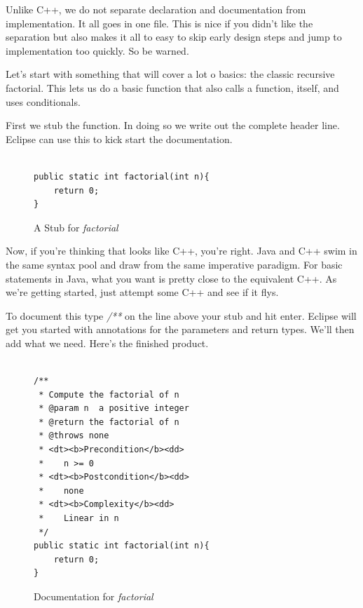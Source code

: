 \documentclass[]{tufte-handout}
\begin{document}
Unlike C++, we do not separate declaration and documentation from implementation. It all goes in one file. This is nice if you didn't like the separation but also makes it all to easy to skip early design steps and jump to implementation too quickly. So be warned.


Let's start with something that will cover a lot o basics: the classic recursive factorial. This lets us do a basic function that also calls a function, itself, and uses conditionals.

First we stub the function. In doing so we write out the complete header line. Eclipse can use this to kick start the documentation.

\begin{figure}
\begin{lstlisting}

public static int factorial(int n){
	return 0;
}

\end{lstlisting}
\caption{A Stub for \textit{factorial}}
\label{fig:funcStub}
\end{figure}

Now, if you're thinking that looks like C++, you're right. Java and C++ swim in the same syntax pool and draw from the same imperative paradigm. For basic statements in Java, what you want is pretty close to the equivalent C++. As we're getting started, just attempt some C++ and see if it flys.

To document this type \textit{/**} on the line above your stub and hit enter. Eclipse will get you started with annotations for the parameters and return types. We'll then add what we need. Here's the finished product.

\begin{figure}
\begin{lstlisting}

/**
 * Compute the factorial of n
 * @param n	 a positive integer
 * @return the factorial of n
 * @throws none
 * <dt><b>Precondition</b><dd>
 *    n >= 0
 * <dt><b>Postcondition</b><dd>
 *    none
 * <dt><b>Complexity</b><dd>
 *    Linear in n
 */
public static int factorial(int n){
	return 0;
}

\end{lstlisting}
\caption{Documentation for \textit{factorial}}
\label{fig:factDoxed}
\end{figure}
\end{document}
